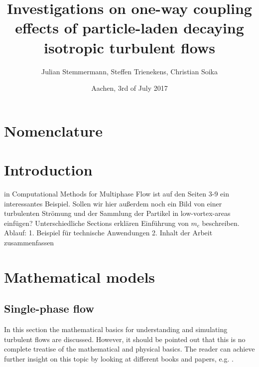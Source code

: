 \documentclass[a4paper,12pt]{article}
\title{Investigations on one-way coupling effects of particle-laden decaying isotropic turbulent flows}
\author{Julian Stemmermann, Steffen Trienekens, Christian Soika}
\date{Aachen, 3rd of July 2017}
\numberwithin{equation}{section} %
\begin{document}
\maketitle

\setlength{\columnsep}{30pt}

\pagebreak

\tableofcontents{} %
 
\pagebreak

\section{Nomenclature}
\begin{multicols}{2}
\setlength{\columnseprule}{1pt}
\printnomenclature
\end{multicols}
\pagebreak

\section{Introduction}
in Computational Methods for Multiphase Flow ist auf den Seiten 3-9 ein interessantes Beispiel.
Sollen wir hier außerdem noch ein Bild von einer turbulenten Strömung und der Sammlung der Partikel in low-vortex-areas einfügen?
Unterschiedliche Sections erklären
Einführung von $m_c$ beschreiben. 
Ablauf:
1. Beispiel für technische Anwendungen
2. Inhalt der Arbeit zusammenfassen
\pagebreak
\section{Mathematical models}
\subsection{Single-phase flow} %
In this section the mathematical basics for understanding and simulating turbulent flows are discussed. However, it should be pointed out that this is no
complete treatise of the mathematical and physical basics. The reader can achieve further insight on this topic by looking at different books and papers, 
e.g. \cite{turbulentFlows}.
\newline
\end{document}
